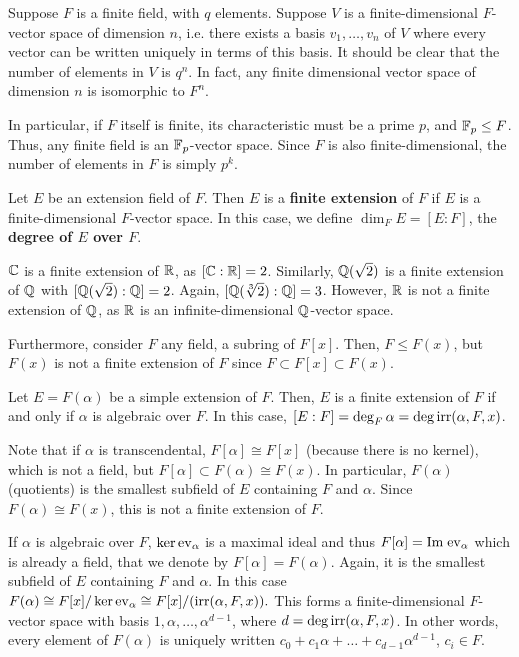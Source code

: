 \documentclass{../mathnotes}
\begin{document}
\begin{rem}
    Suppose $F$ is a finite field, with $q$ elements. Suppose $V$ is a finite-dimensional $F$-vector space of dimension $n$,
    i.e. there exists a basis $v_1,\ldots, v_n$ of $V$ where every vector can be written uniquely in terms of this basis.
    It should be clear that the number of elements in $V$ is $q^n$. In fact, any finite dimensional vector space of dimension
    $n$ is isomorphic to $F^n$.
    
    In particular, if $F$ itself is finite, its characteristic must be a prime $p$, and $\mathbb{F}_p\leq F$.
    Thus, any finite field is an $\mathbb{F}_p$-vector space. Since $F$ is also finite-dimensional, the number of elements in $F$
    is simply $p^k$.
\end{rem}

\begin{defn}
    Let $E$ be an extension field of $F$. Then $E$ is a \textbf{finite extension} of $F$ if $E$ is a finite-dimensional
    $F$-vector space. In this case, we define $\dim_F E=[E:F]$, the \textbf{degree of $E$ over $F$}.
\end{defn}
\begin{exmp}
    $\mathbb{C}$ is a finite extension of $\mathbb{R}$, as $[\mathbb{C}:\mathbb{R}]=2$. Similarly, $\mathbb{Q}(\sqrt{2})$ is a finite extension of $\mathbb{Q}$ with
    $[\mathbb{Q}(\sqrt{2}):\mathbb{Q}]=2$. Again, $[\mathbb{Q}(\sqrt[3]{2}):\mathbb{Q}]=3$. However, $\mathbb{R}$ is not a finite extension of $\mathbb{Q}$, as $\mathbb{R}$ is
    an infinite-dimensional $\mathbb{Q}$-vector space.

    Furthermore, consider $F$ any field, a subring of $F[x]$. Then, $F\leq F(x)$, but $F(x)$ is not a finite extension
    of $F$ since $F\subset F[x]\subset F(x)$.
\end{exmp}

\begin{thm}
    Let $E=F(\alpha)$ be a simple extension of $F$. Then, $E$ is a finite extension of $F$ if and only if
    $\alpha$ is algebraic over $F$. In this case, $[E:F]=\deg_F\alpha=\deg\operatorname{irr}(\alpha,F,x)$.
\end{thm}

Note that if $\alpha$ is transcendental, $F[\alpha]\cong F[x]$ (because there is no kernel), which is not a field,
but $F[\alpha]\subset F(\alpha)\cong F(x)$. In particular, $F(\alpha)$ (quotients) is the smallest subfield of $E$ containing $F$
and $\alpha$. Since $F(\alpha)\cong F(x)$, this is not a finite extension of $F$.

If $\alpha$ is algebraic over $F$, $\ker{\rm ev}_\alpha$ is a maximal ideal and thus $F[\alpha]={\rm Im}\;{\rm ev}_\alpha$
which is already a field, that we denote by $F[\alpha]=F(\alpha)$. Again, it is the smallest subfield of $E$ containing
$F$ and $\alpha$. In this case $F(\alpha)\cong F[x]/\ker{\rm ev}_\alpha\cong F[x]/(\operatorname{irr}(\alpha,F,x)).$ This forms a 
finite-dimensional $F$-vector space with basis $1,\alpha,\ldots,\alpha^{d-1}$, where $d=\deg\operatorname{irr}(\alpha,F,x)$. In other words,
every element of $F(\alpha)$ is uniquely written $c_0+c_1\alpha+\ldots+c_{d-1}\alpha^{d-1}$, $c_i\in F$.
\end{document}

